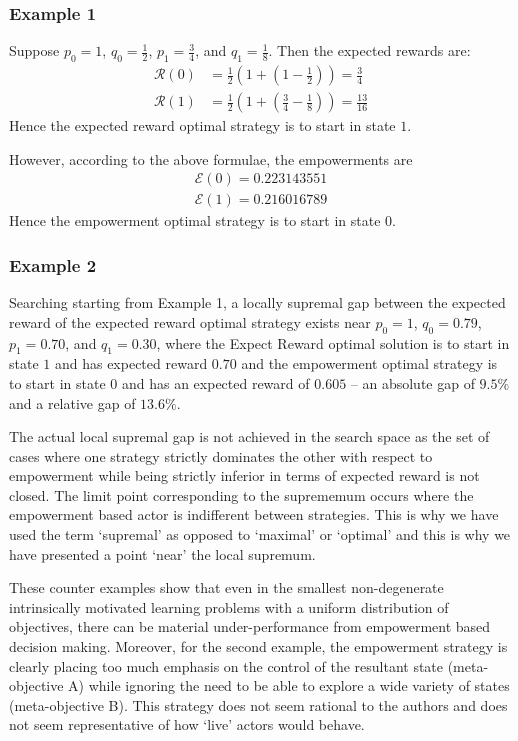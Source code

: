 \documentclass{article}
\newcommand{\Ee}{\mathcal{E}}
\newcommand{\Rr}{\mathcal{R}}
\begin{document}
\subsubsection{Example 1}
Suppose $p_0=1$, $q_0=\frac{1}{2}$, $p_1=\frac{3}{4}$, and $q_1 = \frac{1}{8}$. Then the expected rewards are:
\begin{align*}
\Rr(0) &= \frac{1}{2}\left(1+\left(1-\frac{1}{2}\right)\right)=\frac{3}{4}\\
\Rr(1) &= \frac{1}{2}\left(1+\left(\frac{3}{4}-\frac{1}{8}\right)\right)=\frac{13}{16}
\end{align*}
Hence the expected reward optimal strategy is to start in state $1$.

However, according to the above formulae, the empowerments are
\begin{align*}
\Ee(0)=0.223143551\\
\Ee(1)=0.216016789 
\end{align*}
Hence the empowerment optimal strategy is to start in state $0$.

\subsubsection{Example 2}
Searching starting from Example 1, a locally supremal gap between the expected reward of the expected reward optimal strategy exists near $p_0=1$, $q_0=0.79$, $p_1=0.70$, and $q_1 = 0.30$, where the Expect Reward optimal solution is to start in state $1$ and has expected reward $0.70$ and the empowerment optimal strategy is to start in state $0$ and has an expected reward of $0.605$ -- an absolute gap of $9.5\%$ and a relative gap of $13.6\%$. 

The actual local supremal gap is not achieved in the search space as the set of cases where one strategy strictly dominates the other with respect to empowerment while being strictly inferior in terms of expected reward is not closed. The limit point corresponding to the suprememum occurs where the empowerment based actor is indifferent between strategies. This is why we have used the term `supremal' as opposed to `maximal' or `optimal' and this is why we have presented a point `near' the local supremum.

These counter examples show that even in the smallest non-degenerate intrinsically motivated learning problems with a uniform distribution of objectives, there can be material under-performance from empowerment based decision making. Moreover, for the second example, the empowerment strategy is clearly placing too much emphasis on the control of the resultant state (meta-objective A) while ignoring the need to be able to explore a wide variety of states (meta-objective B). This strategy does not seem rational to the authors and does not seem representative of how `live' actors would behave.
\end{document}
